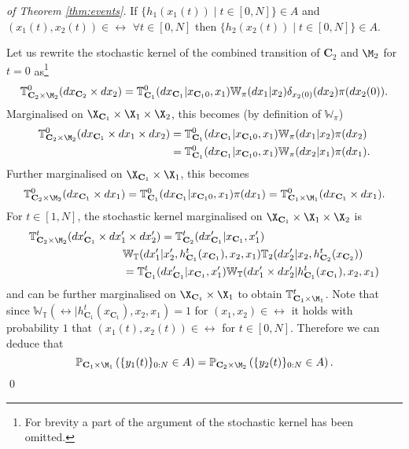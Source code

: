 \documentclass[letterpaper, 10 pt, conference]{amsart}
\theoremstyle{definition}
\theoremstyle{example}
\theoremstyle{remark}
\newcommand{\po}{\mathbb{P}}     \newcommand{\p}[1]{\po\left(#1\right)}     \newcommand{\pd}[1]{p\left(#1\right)}     \newcommand{\borel}[1]{\mathcal{B}\left(#1\right)}
\newcommand{\C}{{\mathbf{C}}}
\newcommand{\Wt}{\mathbb{W}_{\mathbb{T}}}
\begin{document}
 \begin{proof}[of Theorem \ref{thm:events}]
If $\{h_1(x_1(t)){\mid}t\in[0,N]\}\in A$ and $(x_1(t),x_2(t))\in\rel$ $\forall t\in[0,N]$ then $\{h_2(x_2(t)){\mid}t\in[0,N]\}\in A$.\\ \medskip

Let us rewrite the stochastic kernel of the combined transition of $\C_2$ and $\M_2$ for $t=0$ as\footnote{For brevity a part of the argument of the stochastic kernel has been omitted.} 
\[
\mathbb T^0_{\C_2\times \M_2}(d x_{\C_2}\times dx_2) = 
\mathbb T^0_{\C_1} (dx_{\C_1}{\mid}x_{\C_10},x_1)\mathbb W_\pi(dx_1 {\mid} x_2 )\delta_{x_2(0)}(dx_2)\pi(dx_2(0)). 
\]
Marginalised on $\X_{\C_1}\times \X_1\times\X_2$, this becomes (by definition of $\mathbb W_{\pi}$)
\begin{align*}\mathbb T^0_{\C_2\times \M_2}(d x_{\C_1}\times dx_1\times dx_2)&= 
\mathbb T^0_{\C_1} (dx_{\C_1}{\mid}x_{\C_10},x_1)\mathbb W_\pi(dx_1 {\mid} x_2 )\pi(dx_2)\\
&=\mathbb T^0_{\C_1} (dx_{\C_1}{\mid}x_{\C_10},x_1)\mathbb W_\pi(dx_2 {\mid} x_1 )\pi(dx_1). 
\end{align*}
Further marginalised on $\X_{\C_1}\times\X_1$, this becomes 
\begin{align*}
\mathbb T^0_{\C_2\times \M_2}(d x_{\C_1}\times dx_1)= 
\mathbb T^0_{\C_1} (dx_{\C_1}{\mid}x_{\C_10},x_1)\pi(dx_1)= \mathbb T^0_{\C_1\times \M_1}(d x_{\C_1}\times dx_1).
\end{align*}
For $t\in [1, N]$, 
the stochastic kernel marginalised on $\X_{\C_1}\times\X_1\times \X_2$ is 
\begin{align*}&\mathbb T^t_{\C_2\times \M_2}(d x_{\C_1}'\times dx_1'\times dx'_2)= \mathbb T^t_{\C_2} (dx_{\C_1}'{\mid}x_{\C_1},x_1')\\ &\hspace{3cm} \Wt(d x_1' {\mid} x_2',h_{\C_1}^t(x_{\C_1}),x_2, x_1)\mathbb T_2(dx_2'{\mid}x_2,h^t_{\C_2}(x_{\C_2}) )\\
&\hspace{3cm}= \mathbb T^t_{\C_1} (dx_{\C_1}'{\mid}x_{\C_1},x_1')\Wt(d x_1'\times d x_2' {\mid} h_{\C_1}^t(x_{\C_1}),x_2, x_1)\end{align*}
and can be further marginalised on $\X_{\C_1}\times \X_1$ to obtain $\mathbb T^t_{\C_1\times \M_1} $. 
Note that since $\Wt(\rel {\mid} h_{\C_1}^t(x_{\C_1}),x_2, x_1)=1$ for $(x_1,x_2)\in \rel$ it holds with probability $1$ that $(x_1(t),x_2(t))\in \rel$ for $t\in[0,N]$. 
Therefore we can deduce that 
 \[ \po_{\C_1\times\M_1}\left(\{y_1 (t)\}_{0:N}\in A\right)= \po_{\C_2\times\M_2}\left(\{y_2 (t)\}_{0:N}\in A\right).\] 
\qed \end{proof}
 
\end{document}
